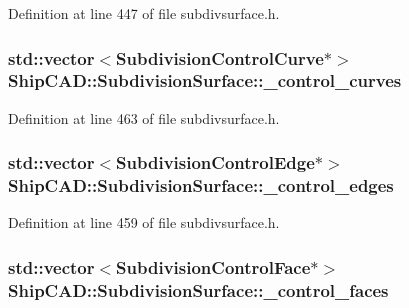 Definition at line 447 of file subdivsurface.\+h.

\subsubsection[{\texorpdfstring{\+\_\+control\+\_\+curves}{_control_curves}}]{\setlength{\rightskip}{0pt plus 5cm}std\+::vector$<${\bf Subdivision\+Control\+Curve}$\ast$$>$ Ship\+C\+A\+D\+::\+Subdivision\+Surface\+::\+\_\+control\+\_\+curves\hspace{0.3cm}{\ttfamily [protected]}}\hypertarget{classShipCAD_1_1SubdivisionSurface_a72da0f8a60e186e10b88f48950a490e9}{}\label{classShipCAD_1_1SubdivisionSurface_a72da0f8a60e186e10b88f48950a490e9}


Definition at line 463 of file subdivsurface.\+h.

\subsubsection[{\texorpdfstring{\+\_\+control\+\_\+edges}{_control_edges}}]{\setlength{\rightskip}{0pt plus 5cm}std\+::vector$<${\bf Subdivision\+Control\+Edge}$\ast$$>$ Ship\+C\+A\+D\+::\+Subdivision\+Surface\+::\+\_\+control\+\_\+edges\hspace{0.3cm}{\ttfamily [protected]}}\hypertarget{classShipCAD_1_1SubdivisionSurface_ac6b2950f05e07f5a7814b278a9dc1513}{}\label{classShipCAD_1_1SubdivisionSurface_ac6b2950f05e07f5a7814b278a9dc1513}


Definition at line 459 of file subdivsurface.\+h.

\subsubsection[{\texorpdfstring{\+\_\+control\+\_\+faces}{_control_faces}}]{\setlength{\rightskip}{0pt plus 5cm}std\+::vector$<${\bf Subdivision\+Control\+Face}$\ast$$>$ Ship\+C\+A\+D\+::\+Subdivision\+Surface\+::\+\_\+control\+\_\+faces\hspace{0.3cm}{\ttfamily [protected]}}\hypertarget{classShipCAD_1_1SubdivisionSurface_a69c240904f61f8181a57559d4fa548c0}{}\label{classShipCAD_1_1SubdivisionSurface_a69c240904f61f8181a57559d4fa548c0}


